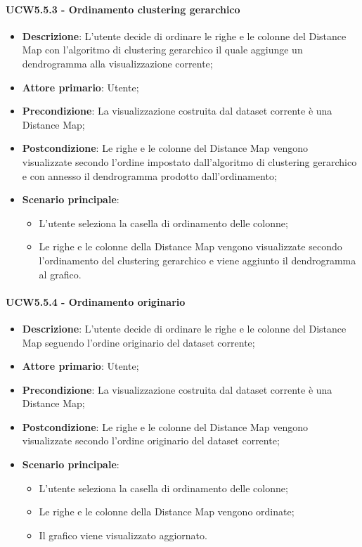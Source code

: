 \paragraph{UCW5.5.3 - Ordinamento clustering gerarchico}
\label{par:ucw5.5.3}
\begin{itemize}
    \item \textbf{Descrizione}: L'utente decide di ordinare le righe e le colonne del Distance Map con l'algoritmo di clustering gerarchico il quale aggiunge un dendrogramma alla visualizzazione corrente;
    \item \textbf{Attore primario}: Utente;
    \item \textbf{Precondizione}: La visualizzazione costruita dal dataset corrente è una Distance Map;
    \item \textbf{Postcondizione}: Le righe e le colonne del Distance Map vengono visualizzate secondo l'ordine impostato dall'algoritmo di clustering gerarchico e con annesso il dendrogramma prodotto dall'ordinamento;
    \item \textbf{Scenario principale}:
          \begin{itemize}
              \item L'utente seleziona la casella di ordinamento delle colonne;
              \item Le righe e le colonne della Distance Map vengono visualizzate secondo l'ordinamento del clustering gerarchico e viene aggiunto il dendrogramma al grafico.
          \end{itemize}
\end{itemize}

\paragraph{UCW5.5.4 - Ordinamento originario}
\label{par:ucw5.5.4}
\begin{itemize}
    \item \textbf{Descrizione}: L'utente decide di ordinare le righe e le colonne del Distance Map seguendo l'ordine originario del dataset corrente;
    \item \textbf{Attore primario}: Utente;
    \item \textbf{Precondizione}: La visualizzazione costruita dal dataset corrente è una Distance Map;
    \item \textbf{Postcondizione}: Le righe e le colonne del Distance Map vengono visualizzate secondo l'ordine originario del dataset corrente;
    \item \textbf{Scenario principale}:
          \begin{itemize}
              \item L'utente seleziona la casella di ordinamento delle colonne;
              \item Le righe e le colonne della Distance Map vengono ordinate;
              \item Il grafico viene visualizzato aggiornato.
          \end{itemize}
\end{itemize}

